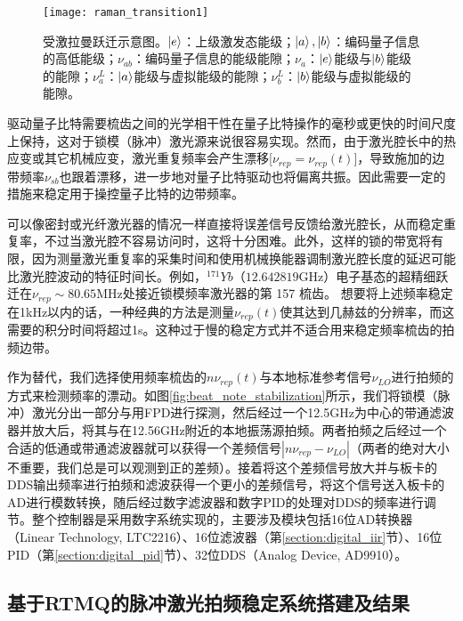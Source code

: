\begin{figure}
    \centering
    \caption[受激拉曼跃迁示意图]{受激拉曼跃迁示意图。$\ket{e}$：上级激发态能级；$\ket{a},\ket{b}$：编码量子信息的高低能级；$\nu_{ab}$：编码量子信息的能级能隙；$\nu_{a}$：$\ket{e}$能级与$\ket{b}$能级的能隙；$\nu_a^L$：$\ket{a}$能级与虚拟能级的能隙；$\nu_b^L$：$\ket{b}$能级与虚拟能级的能隙。\label{fig:raman_transition1}}
    \texttt{[image: raman\_transition1]}
\end{figure}

驱动量子比特需要梳齿之间的光学相干性在量子比特操作的毫秒或更快的时间尺度上保持，这对于锁模（脉冲）激光源来说很容易实现\cite[]{Hayes_Matsukevich_Maunz_Hucul_Quraishi_Olmschenk_Campbell_Mizrahi_Senko_Monroe_2010}。然而，由于激光腔长中的热应变或其它机械应变，激光重复频率会产生漂移[$\nu_{rep}=\nu_{rep}(t)$]，导致施加的边带频率$\nu_{sb}$也跟着漂移，进一步地对量子比特驱动也将偏离共振。因此需要一定的措施来稳定用于操控量子比特的边带频率。

可以像密封或光纤激光器的情况一样直接将误差信号反馈给激光腔长，从而稳定重复率，不过当激光腔不容易访问时，这将十分困难。此外，这样的锁的带宽将有限，因为测量激光重复率的采集时间和使用机械换能器调制激光腔长度的延迟可能比激光腔波动的特征时间长。例如，$^{171}Yb$（$12.642819 $GHz）电子基态的超精细跃迁在$ \nu_{rep} \sim 80.65$MHz处接近锁模频率激光器的第 157 梳齿。
想要将上述频率稳定在1kHz以内的话，一种经典的方法是测量$\nu_{rep}(t)$使其达到几赫兹的分辨率，而这需要的积分时间将超过1s。这种过于慢的稳定方式并不适合用来稳定频率梳齿的拍频边带。

作为替代，我们选择使用频率梳齿的$n\nu_{rep}(t)$与本地标准参考信号$\nu_{LO}$进行拍频的方式来检测频率的漂动。如图\ref{fig:beat_note_stabilization}所示，我们将锁模（脉冲）激光分出一部分与用FPD进行探测，然后经过一个12.5GHz为中心的带通滤波器并放大后，将其与在12.56GHz附近的本地振荡源拍频。两者拍频之后经过一个合适的低通或带通滤波器就可以获得一个差频信号$|n\nu_{rep}-\nu_{LO}|$（两者的绝对大小不重要，我们总是可以观测到正的差频）。接着将这个差频信号放大并与板卡的DDS输出频率进行拍频和滤波获得一个更小的差频信号，将这个信号送入板卡的AD进行模数转换，随后经过数字滤波器和数字PID的处理对DDS的频率进行调节。整个控制器是采用数字系统实现的，主要涉及模块包括16位AD转换器（Linear Technology, LTC2216）、16位滤波器（第\ref{section:digital_iir}节）、16位PID（第\ref{section:digital_pid}节）、32位DDS（Analog Device, AD9910）。






\subsection[基于RTMQ的脉冲激光拍频稳定系统搭建及结果]{基于RTMQ的脉冲激光拍频稳定系统搭建及结果}

